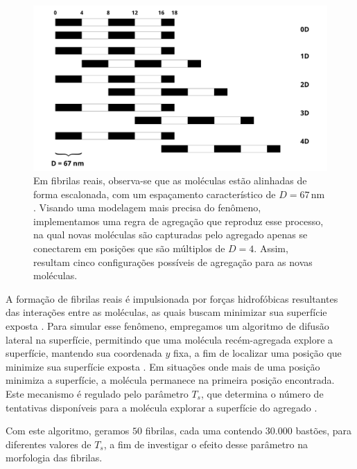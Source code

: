 \documentclass{article}
\begin{document}
        \begin{figure}[H]
            \centering
            \includegraphics[width=\textwidth]{figures/specific_bind.png}
    
            \caption{Em fibrilas reais, observa-se que as moléculas estão alinhadas de forma escalonada, com um espaçamento característico de 
            \(D = 67 \, \text{nm}\). Visando uma modelagem mais precisa do fenômeno, implementamos uma regra de agregação que reproduz esse 
            processo, na qual novas moléculas são capturadas pelo agregado apenas se conectarem em posições que são múltiplos de \(D = 4\). 
            Assim, resultam cinco configurações possíveis de agregação para as novas moléculas.}  
    
            \label{M2}
        \end{figure}

        A formação de fibrilas reais é impulsionada por forças hidrofóbicas resultantes das interações entre as moléculas, as quais buscam 
        minimizar sua superfície exposta \cite{Kadler1987,Parkinson1995}. Para simular esse fenômeno, empregamos um algoritmo de difusão lateral
        na superfície, permitindo que uma molécula recém-agregada explore a superfície, mantendo sua coordenada \(y\) fixa, a fim de localizar 
        uma posição que minimize sua superfície exposta \cite{GarcaRuiz1991}. Em situações onde mais de uma posição minimiza a superfície, a 
        molécula permanece na primeira posição encontrada. Este mecanismo é regulado pelo parâmetro \(T_{s}\), que determina o número de 
        tentativas disponíveis para a molécula explorar a superfície do agregado \cite{Parkinson1995}.

        Com este algoritmo, geramos \(50\) fibrilas, cada uma contendo \(30.000\) bastões, para diferentes valores de \(T_{s}\), a fim de 
        investigar o efeito desse parâmetro na morfologia das fibrilas. 
\end{document}
